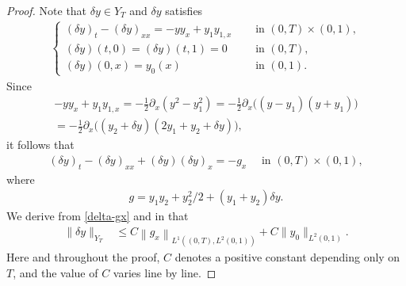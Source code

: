 \documentclass[11pt, reqno]{amsart}
\theoremstyle{plain}
\numberwithin{equation}{section}
\begin{document}
\begin{proof}
Note that $\delta y \in Y_T$ and $\delta y$ satisfies
\begin{align}	\label{sys-deltay}
	\begin{cases}
		(\delta y)_t - (\delta y)_{xx}  = -yy_x + y_1 y_{1,x} \quad &\text{ in } (0, T) \times (0, 1), \\
		(\delta y)(t, 0) = (\delta y)(t, 1) = 0 &\text{ in } (0, T), \\
		(\delta y)(0, x) = y_0(x) &\text{ in } (0, 1).
	\end{cases}
\end{align}	
Since
\begin{multline}  \label{yyx-y1y1x}
	-y y_x + y_1 y_{1, x}  = -\frac{1}{2} \partial_x(y^2 - y_1^2) = -\frac{1}{2} \partial_x  \Big( (y-y_1) (y + y_1) \Big) \\
	= -\frac{1}{2} \partial_x \Big((y_2 + \delta y)(2y_1 + y_2 + \delta y) \Big), 
\end{multline}
it follows that 
\begin{align}	\label{delta-gx}
(\delta y)_t - (\delta y)_{xx} + (\delta y) (\delta y)_x = - g_x \quad \mbox{ in } (0, T) \times (0, 1),
\end{align}
where
\begin{align} \label{yyx-y1y1x-2}
g = y_1 y_2 + y_2^2/2  + (y_1 + y_2) \delta y. 
\end{align}
We derive from \eqref{delta-gx} and   in  that 
	\begin{align}
		\|\delta y\|_{Y_T} &\leq C \left\| g_x \right\|_{L^1((0, T), L^2(0, 1))} + C \|y_0\|_{L^2(0, 1)}.	\label{deltay-YT}
	\end{align}	
Here and throughout the proof, $C$ denotes a positive constant depending only on $T$, and the value of $C$ varies line by line. 


\end{proof}
\end{document}
